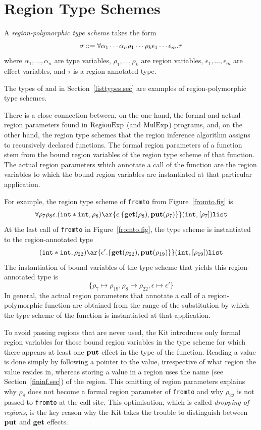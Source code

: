 \documentclass[12pt]{book}
\begin{document}
\section{Region Type Schemes}
\label{regtych.sec}
A 
%
{\em region-polymorphic type scheme} takes the form
$$\sigma::=\forall\alpha_1\cdots\alpha_n\rho_1\cdots\rho_k\epsilon_1\cdots\epsilon_m.\tau$$
where $\alpha_1,\ldots,\alpha_n$ are type variables,
$\rho_1,\ldots,\rho_k$ are region variables,
$\epsilon_1,\ldots,\epsilon_m$ are effect variables,
and $\tau$ is a region-annotated type.

The types of  and \boxml{::} in Section~\ref{listtypes.sec} are examples of 
%
region-polymorphic type schemes. 

There is a close connection between, on the one hand, the formal and
actual 
%
region parameters found in $\hbox{\rm RegionExp}$
(and $\hbox{\rm MulExp}$) programs, and, on the other hand, the 
%
region type schemes that the region inference algorithm
assigns to recursively declared functions. The formal region
parameters of a function stem from the bound region variables of the
region type scheme of that function.  The actual region parameters which
annotate a call of the function are the region variables to which the bound
region variables are instantiated at that particular application.

For example, the region type scheme of {\tt fromto} from Figure~\ref{fromto.fig} is
$$\forall\rho_7\rho_8\epsilon.(\boxml{int} \ast \boxml{int},\rho_8)\ar{\epsilon.\{
\Get(\rho_8),\Put(\rho_7)\}} (\boxml{int},[\rho_7])\boxml{list}$$
At the last call of {\tt fromto} in Figure~\ref{fromto.fig},
the type scheme is instantiated to the region-annotated type
$$(\boxml{int} \ast \boxml{int},\rho_{22})\ar{\epsilon'.\{
\Get(\rho_{22}),\Put(\rho_{19})\}} (\boxml{int},[\rho_{19}])\boxml{list}$$
The instantiation of bound variables of the type scheme that yields this region-annotated type is
$$\{\rho_7\mapsto\rho_{19}, \rho_8\mapsto\rho_{22}, \epsilon\mapsto\epsilon'\}$$
In general, the actual region parameters that annotate a call of a region-polymorphic function are obtained from
the range of the substitution by which the type scheme of the function is  instantiated at that
application.

To avoid passing regions that are never used, the Kit introduces only 
formal region variables for those bound region variables in the type scheme
for which there appears at least one $\mathop{\bf put}\nolimits$ effect in the type of the function.
Reading a value is done simply by following a pointer to the value, irrespective
of what region the value resides in, whereas storing a value in a region uses the
name (see Section~\ref{fininf.sec}) of the region.
This omitting of region parameters explains why $\rho_8$ does not become a formal region parameter of {\tt fromto} and why
$\rho_{22}$ is not passed to {\tt fromto} at the call site. This optimisation,
which is called 
%
{\em dropping of regions}, is the key reason why the Kit takes the
trouble to distinguish between $\mathop{\bf put}\nolimits$ and $\mathop{\bf get}\nolimits$
effects\label{bother-to-distinguish-get-n-put}.
\end{document}
